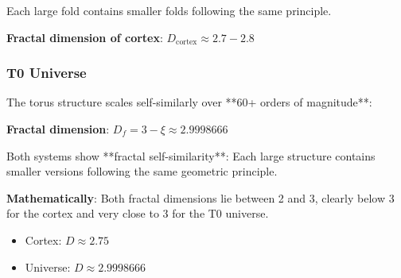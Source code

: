 	Each large fold contains smaller folds following the same principle.

	\textbf{Fractal dimension of cortex}: $D_{\text{cortex}} \approx 2.7 - 2.8$

	\subsubsection{T0 Universe}

	The torus structure scales self-similarly over **60+ orders of magnitude**:

	\begin{table}[H]
		\centering
		\small
		\caption{Self-similar torus structures across scales}
	\end{table}

	\textbf{Fractal dimension}: $D_f = 3 - \xi \approx 2.9998666$

	\begin{keyresult}
		Both systems show **fractal self-similarity**: Each large structure contains smaller versions following the same geometric principle.

		\textbf{Mathematically}: Both fractal dimensions lie between 2 and 3, clearly below 3 for the cortex and very close to 3 for the T0 universe.
		\begin{itemize}
			\item Cortex: $D \approx 2.75$
			\item Universe: $D \approx 2.9998666$
		\end{itemize}
	\end{keyresult}

